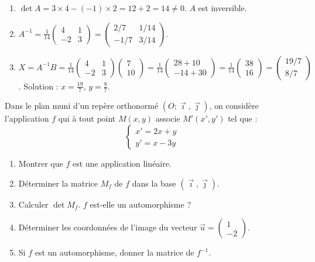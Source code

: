 \documentclass[11pt]{article}
\begin{document}
\begin{corrige}[Exercice 1]
\begin{enumerate}
  \item $\det A = 3\times4 - (-1)\times2 = 12+2=14 \neq 0$. $A$ est inversible.
  \item $A^{-1} = \frac{1}{14}\begin{pmatrix} 4 & 1 \\ -2 & 3 \end{pmatrix} = \begin{pmatrix} 2/7 & 1/14 \\ -1/7 & 3/14 \end{pmatrix}$.
  \item $X = A^{-1}B = \frac{1}{14}\begin{pmatrix} 4 & 1 \\ -2 & 3 \end{pmatrix}\begin{pmatrix} 7 \\ 10 \end{pmatrix} = \frac{1}{14}\begin{pmatrix} 28+10 \\ -14+30 \end{pmatrix} = \frac{1}{14}\begin{pmatrix} 38 \\ 16 \end{pmatrix} = \begin{pmatrix} 19/7 \\ 8/7 \end{pmatrix}$.
  Solution : $x=\frac{19}{7}$, $y=\frac{8}{7}$.
\end{enumerate}
\end{corrige}

\begin{exercice}
Dans le plan muni d'un repère orthonormé $(O;\vec{\imath},\vec{\jmath})$, on considère l'application $f$ qui à tout point $M(x,y)$ associe $M'(x',y')$ tel que :
\[
\begin{cases} x' = 2x + y \\ y' = x - 3y \end{cases}
\]
\begin{enumerate}
  \item Montrer que $f$ est une application linéaire.
  \item Déterminer la matrice $M_f$ de $f$ dans la base $(\vec{\imath},\vec{\jmath})$.
  \item Calculer $\det M_f$. $f$ est-elle un automorphisme ?
  \item Déterminer les coordonnées de l'image du vecteur $\vec{u}=\begin{pmatrix} 1 \\ -2 \end{pmatrix}$.
  \item Si $f$ est un automorphisme, donner la matrice de $f^{-1}$.
\end{enumerate}
\end{exercice}
\end{document}
